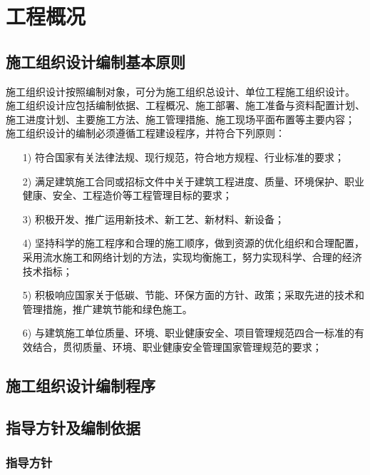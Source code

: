 \section{工程概况}
\subsection{施工组织设计编制基本原则}

施工组织设计按照编制对象，可分为施工组织总设计、单位工程施工组织设计。
施工组织设计应包括编制依据、工程概况、施工部署、施工准备与资料配置计划、
施工进度计划、主要施工方法、施工管理措施、施工现场平面布置等主要内容；
施工组织设计的编制必须遵循工程建设程序，并符合下列原则：

\begin{itemize}

    \item [1)] 符合国家有关法律法规、现行规范，符合地方规程、行业标准的要求；

    \item [2)] 满足建筑施工合同或招标文件中关于建筑工程进度、质量、环境保护、职业健康、安全、工程造价等工程管理目标的要求；

    \item [3)] 积极开发、推广运用新技术、新工艺、新材料、新设备；

    \item [4)] 坚持科学的施工程序和合理的施工顺序，做到资源的优化组织和合理配置，采用流水施工和网络计划的方法，实现均衡施工，努力实现科学、合理的经济技术指标；

    \item [5)] 积极响应国家关于低碳、节能、环保方面的方针、政策；采取先进的技术和管理措施，推广建筑节能和绿色施工。

    \item [6)] 与建筑施工单位质量、环境、职业健康安全、项目管理规范四合一标准的有效结合，贯彻质量、环境、职业健康安全管理国家管理规范的要求；

\end{itemize}

\subsection{施工组织设计编制程序}
\subsection{指导方针及编制依据}

\subsubsection{指导方针}
